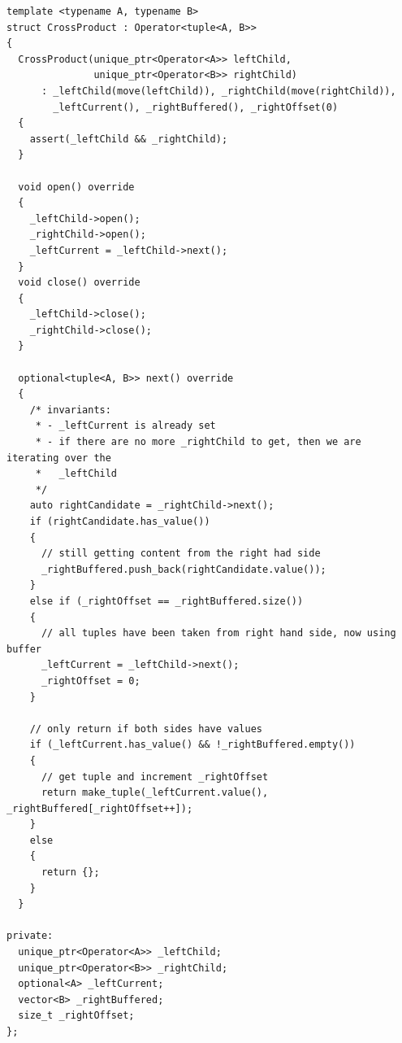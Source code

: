 \begin{verbatim}
template <typename A, typename B>
struct CrossProduct : Operator<tuple<A, B>>
{
  CrossProduct(unique_ptr<Operator<A>> leftChild,
               unique_ptr<Operator<B>> rightChild)
      : _leftChild(move(leftChild)), _rightChild(move(rightChild)),
        _leftCurrent(), _rightBuffered(), _rightOffset(0)
  {
    assert(_leftChild && _rightChild);
  }

  void open() override
  {
    _leftChild->open();
    _rightChild->open();
    _leftCurrent = _leftChild->next();
  }
  void close() override
  {
    _leftChild->close();
    _rightChild->close();
  }

  optional<tuple<A, B>> next() override
  {
    /* invariants:
     * - _leftCurrent is already set
     * - if there are no more _rightChild to get, then we are iterating over the
     *   _leftChild
     */
    auto rightCandidate = _rightChild->next();
    if (rightCandidate.has_value())
    {
      // still getting content from the right had side
      _rightBuffered.push_back(rightCandidate.value());
    }
    else if (_rightOffset == _rightBuffered.size())
    {
      // all tuples have been taken from right hand side, now using buffer
      _leftCurrent = _leftChild->next();
      _rightOffset = 0;
    }

    // only return if both sides have values
    if (_leftCurrent.has_value() && !_rightBuffered.empty())
    {
      // get tuple and increment _rightOffset
      return make_tuple(_leftCurrent.value(), _rightBuffered[_rightOffset++]);
    }
    else
    {
      return {};
    }
  }

private:
  unique_ptr<Operator<A>> _leftChild;
  unique_ptr<Operator<B>> _rightChild;
  optional<A> _leftCurrent;
  vector<B> _rightBuffered;
  size_t _rightOffset;
};
\end{verbatim}


